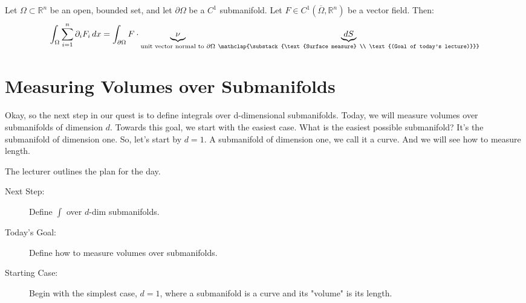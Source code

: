 \begin{math-stroke}
\begin{nice-box}
\begin{theorem}
Let $\Omega \subset \mathbb{R}^n$ be an open, bounded set, and let $\partial\Omega$ be a $C^1$ submanifold.
Let $F \in C^1(\overline{\Omega}, \mathbb{R}^n)$ be a vector field. Then:
\[
\int_{\Omega} \sum_{i=1}^n \partial_i F_i \, dx = \int_{\partial\Omega} F \cdot \underbrace{\nu}_{\text{unit vector normal to } \partial\Omega} \, \underbrace{dS}_{\mathclap{\substack{\text{Surface measure} \\ \text{(Goal of today's lecture)}}}}
\]
\end{theorem}
\end{nice-box}
\end{math-stroke}

\section{Measuring Volumes over Submanifolds}

\begin{spoken-clean}[02:19 - 04:30]
Okay, so the next step in our quest is to define integrals over d-dimensional submanifolds. Today, we will measure volumes over submanifolds of dimension $d$. Towards this goal, we start with the easiest case. What is the easiest possible submanifold? It's the submanifold of dimension one. So, let's start by $d=1$. A submanifold of dimension one, we call it a curve. And we will see how to measure length.
\end{spoken-clean}

\begin{math-stroke}
The lecturer outlines the plan for the day.
\begin{description}
    \item[Next Step:] Define $\int$ over $d$-dim submanifolds.
    \item[Today's Goal:] Define how to measure volumes over submanifolds.
    \item[Starting Case:] Begin with the simplest case, $d=1$, where a submanifold is a curve and its "volume" is its length.
\end{description}
\end{math-stroke}

